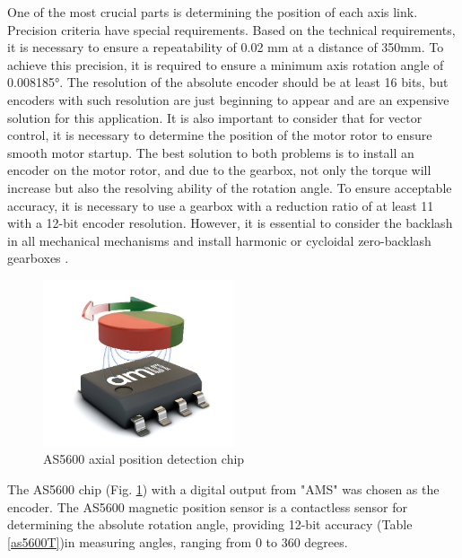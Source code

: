 One of the most crucial parts is determining the position of each axis link. Precision criteria have special requirements. Based on the technical requirements, it is necessary to ensure a repeatability of 0.02 mm at a distance of 350mm. To achieve this precision, it is required to ensure a minimum axis rotation angle of 0.008185°. The resolution of the absolute encoder should be at least 16 bits, but encoders with such resolution are just beginning to appear and are an expensive solution for this application. It is also important to consider that for vector control, it is necessary to determine the position of the motor rotor to ensure smooth motor startup. The best solution to both problems is to install an encoder on the motor rotor, and due to the gearbox, not only the torque will increase but also the resolving ability of the rotation angle. To ensure acceptable accuracy, it is necessary to use a gearbox with a reduction ratio of at least 11 with a 12-bit encoder resolution. However, it is essential to consider the backlash in all mechanical mechanisms and install harmonic or cycloidal zero-backlash gearboxes \citep{Sensinger2012}.


\begin{figure}[H]
	\centering
	\includegraphics[width=0.5\textwidth]{Src/images/as5600.png}
	\caption{AS5600 axial position detection chip}
	\label{as5600P}
\end{figure}
The AS5600 chip (Fig. \ref{as5600P}) with a digital output from "AMS" was chosen as the encoder. The AS5600 magnetic position sensor is a contactless sensor for determining the absolute rotation angle, providing 12-bit accuracy (Table \ref{as5600T})in measuring angles, ranging from 0 to 360 degrees. 


